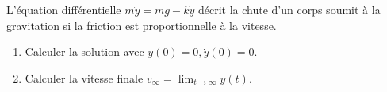 
\begin{exercice}\label{exoEqsDiff0013}

L'équation différentielle $m \ddot y = mg - k\dot y$ décrit la chute d'un corps soumit à la gravitation si la friction est proportionnelle à la vitesse.
\begin{enumerate}

\item
Calculer la solution avec $y(0) =0, \dot y(0) = 0$.
\item
Calculer la \og vitesse finale\fg{}  $v_\infty = \displaystyle \lim_{t \to \infty} \dot y (t)$.

\end{enumerate}

\end{exercice}
